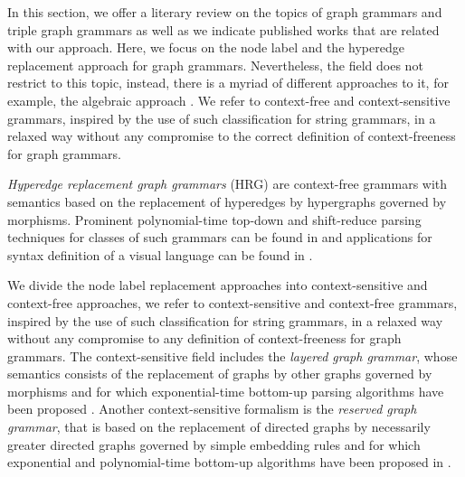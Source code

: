 
In this section, we offer a literary review on the topics of graph grammars and triple graph grammars as well as we indicate published works that are related with our approach. Here, we focus on the node label and the hyperedge replacement approach for graph grammars. Nevertheless, the field does not restrict to this topic, instead, there is a myriad of different approaches to it, for example, the algebraic approach \cite{ehrig1999handbook}. We refer to context-free and context-sensitive grammars, inspired by the use of such classification for string grammars, in a relaxed way without any compromise to the correct definition of context-freeness for graph grammars.

\textit{Hyperedge replacement graph grammars} (HRG) are context-free grammars with semantics based on the replacement of hyperedges by hypergraphs \cite{drewes1997hyperedge} governed by morphisms. Prominent polynomial-time top-down and shift-reduce parsing techniques for classes of such grammars can be found in \cite{drewes2015predictive,drewes2017predictive,bjorklund2016between,chiang2013parsing} and applications for syntax definition of a visual language can be found in \cite{minas2006syntax,engelfriet1998tree}.

We divide the node label replacement approaches into context-sensitive and context-free approaches, we refer to context-sensitive and context-free grammars, inspired by the use of such classification for string grammars, in a relaxed way without any compromise to any definition of context-freeness for graph grammars. The context-sensitive field includes the \textit{layered graph grammar}, whose semantics consists of the replacement of graphs by other graphs governed by morphisms \cite{rekers1997defining} and for which exponential-time bottom-up parsing algorithms have been proposed \cite{rekers1995graph,bottoni2000efficient,furst2011improving}. Another context-sensitive formalism is the \textit{reserved graph grammar}, that is based on the replacement of directed graphs by necessarily greater directed graphs governed by simple embedding rules \cite{zhang2001context} and for which exponential and polynomial-time bottom-up algorithms have been proposed in \cite{zeng2005rgg+,zou2017partial}.


